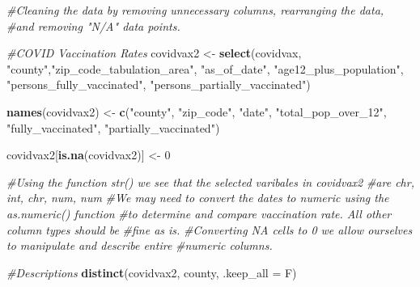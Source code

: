 \documentclass[
]{article}
\newenvironment{Shaded}{\begin{snugshade}}{\end{snugshade}}
\newcommand{\CommentTok}[1]{\textcolor[rgb]{0.56,0.35,0.01}{\textit{#1}}}
\newcommand{\DataTypeTok}[1]{\textcolor[rgb]{0.13,0.29,0.53}{#1}}
\newcommand{\DecValTok}[1]{\textcolor[rgb]{0.00,0.00,0.81}{#1}}
\newcommand{\KeywordTok}[1]{\textcolor[rgb]{0.13,0.29,0.53}{\textbf{#1}}}
\newcommand{\NormalTok}[1]{#1}
\newcommand{\StringTok}[1]{\textcolor[rgb]{0.31,0.60,0.02}{#1}}
\begin{document}
\begin{Shaded}
\begin{Highlighting}[]
\CommentTok{#Cleaning the data by removing unnecessary columns, rearranging the data,}
\CommentTok{#and removing "N/A" data points.}

\CommentTok{#COVID Vaccination Rates}
\NormalTok{covidvax2 <-}\StringTok{ }\KeywordTok{select}\NormalTok{(covidvax, }\StringTok{"county"}\NormalTok{,}\StringTok{"zip_code_tabulation_area"}\NormalTok{, }\StringTok{"as_of_date"}\NormalTok{,}
                    \StringTok{"age12_plus_population"}\NormalTok{, }\StringTok{"persons_fully_vaccinated"}\NormalTok{,}
                    \StringTok{"persons_partially_vaccinated"}\NormalTok{)}

\KeywordTok{names}\NormalTok{(covidvax2) <-}\StringTok{ }\KeywordTok{c}\NormalTok{(}\StringTok{"county"}\NormalTok{, }\StringTok{"zip_code"}\NormalTok{, }\StringTok{"date"}\NormalTok{, }\StringTok{"total_pop_over_12"}\NormalTok{, }
                      \StringTok{"fully_vaccinated"}\NormalTok{, }\StringTok{"partially_vaccinated"}\NormalTok{)}


\NormalTok{covidvax2[}\KeywordTok{is.na}\NormalTok{(covidvax2)] <-}\StringTok{ }\DecValTok{0}

\CommentTok{#Using the function str() we see that the selected varibales in covidvax2 }
\CommentTok{#are chr, int, chr, num, num }
\CommentTok{#We may need to convert the dates to numeric using the as.numeric() function }
\CommentTok{#to determine and compare vaccination rate. All other column types should be }
\CommentTok{#fine as is. }
\CommentTok{#Converting NA cells to 0 we allow ourselves to manipulate and describe entire }
\CommentTok{#numeric columns.}

\CommentTok{#Descriptions}
\KeywordTok{distinct}\NormalTok{(covidvax2, county, }\DataTypeTok{.keep_all =}\NormalTok{ F)}
\end{Highlighting}
\end{Shaded}
\end{document}
